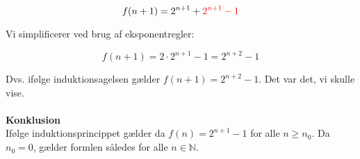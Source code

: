 \begin{equation}
f(n+1) = 2^{n+1} + \textcolor{red}{2^{n+1}-1}
\end{equation}

Vi simplificerer ved brug af eksponentregler:

\begin{equation}
f(n+1) = 2 \cdot 2^{n+1} -1 = 2^{n+2} -1
\end{equation}

Dvs. ifølge induktionsagelsen gælder $f(n+1) = 2^{n+2} -1$. Det var det, vi skulle vise. \\
\\
\textbf{Konklusion}\\
Ifølge induktionsprincippet gælder da $f(n) = 2^{n+1} -1$ for alle $n \geq n_0$. Da $n_0 = 0$, gælder formlen således for alle $n \in \mathbb{N}$. 
